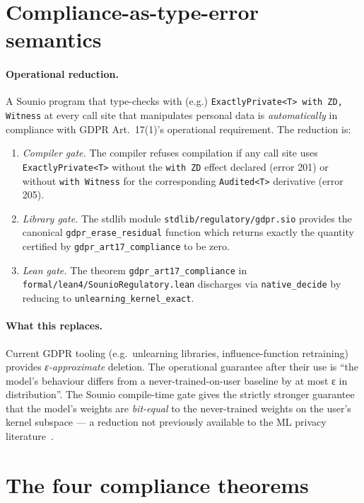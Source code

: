 \documentclass{article}
\begin{document}
\section{Compliance-as-type-error semantics}

\paragraph{Operational reduction.}
A Sounio program that type-checks with (e.g.)
\texttt{ExactlyPrivate<T> with ZD, Witness} at every call site that
manipulates personal data is \emph{automatically} in compliance with
GDPR Art.~17(1)'s operational requirement.  The reduction is:

\begin{enumerate}
\item \emph{Compiler gate.} The compiler refuses compilation if any
      call site uses \texttt{ExactlyPrivate<T>} without the
      \texttt{with ZD} effect declared (error 201) or without
      \texttt{with Witness} for the corresponding
      \texttt{Audited<T>} derivative (error 205).
\item \emph{Library gate.} The stdlib module
      \texttt{stdlib/regulatory/gdpr.sio} provides the canonical
      \texttt{gdpr\_erase\_residual} function which returns exactly the
      quantity certified by \texttt{gdpr\_art17\_compliance} to be zero.
\item \emph{Lean gate.} The theorem \texttt{gdpr\_art17\_compliance}
      in \texttt{formal/lean4/SounioRegulatory.lean} discharges via
      \texttt{native\_decide} by reducing to
      \texttt{unlearning\_kernel\_exact}.
\end{enumerate}

\paragraph{What this replaces.}  Current GDPR tooling (e.g.\ 
unlearning libraries, influence-function retraining) provides
\emph{ε-approximate} deletion.  The operational
guarantee after their use is ``the model's behaviour differs from a
never-trained-on-user baseline by at most ε in distribution''.  The
Sounio compile-time gate gives the strictly stronger guarantee that
the model's weights are \emph{bit-equal} to the never-trained
weights on the user's kernel subspace --- a reduction not previously
available to the ML privacy literature~\cite{neel2021descent,
guo2020certified}.

\section{The four compliance theorems}
\end{document}
